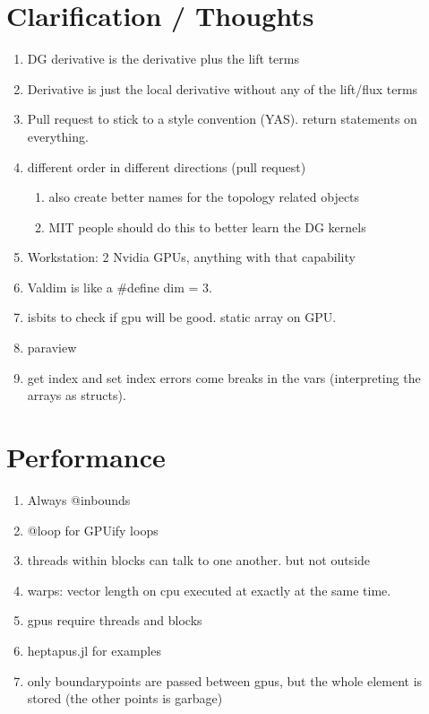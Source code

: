\documentclass{article}
\begin{document}
\section{Clarification / Thoughts}
\begin{enumerate}
    \item DG derivative is the derivative plus the lift terms
    \item Derivative is just the local derivative without any of the lift/flux terms
    \item Pull request to stick to a style convention (YAS). return statements on everything. 
    \item different order in different directions (pull request)
    \begin{enumerate}
        \item also create better names for the topology related objects
        \item MIT people should do this to better learn the DG kernels
    \end{enumerate}
    \item Workstation: 2 Nvidia GPUs, anything with that capability
    \item Val{dim} is like a #define dim = 3. 
    \item isbits to check if gpu will be good. static array on GPU. 
    \item paraview
    \item get index and set index errors come breaks in the vars (interpreting the arrays as structs).
\end{enumerate}
 
\section{Performance}
\begin{enumerate}
    \item Always @inbounds
    \item @loop for GPUify loops
    \item threads within blocks can talk to one another. but not outside
    \item warps: vector length on cpu executed at exactly at the same time.
    \item gpus require threads and blocks
    \item heptapus.jl for examples
    \item only boundarypoints are passed between gpus, but the whole element is stored (the other points is garbage)
\end{enumerate}
\end{document}

